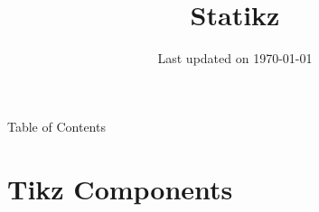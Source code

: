 \documentclass[9pt,xcolor={svgnames, x11names}]{beamer}
\title[\color{black} Statikz\textcolor{Maroon}{2020}]{\Huge Statikz}
\subtitle{} %
\institute{\small Source code at: {\footnotesize\url{https://github.com/dmorgorg/nuLaTeX/blob/master/statikz2020/statikz.pdf}}}
\author{} %
\date{\small Last updated on \today}
\begin{document}

\begin{frame}[plain]
  \titlepage
\end{frame}

\begin{frame}{Table of Contents}
  \begin{minipage}{0.9\textwidth}
    \tableofcontents
  \end{minipage}
  \vfill
\end{frame}

\section{Tikz Components} %
\centering


 

\end{document}
